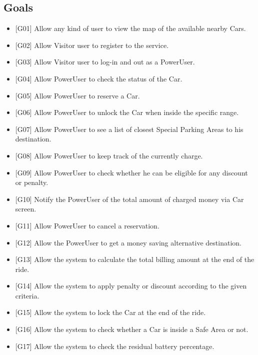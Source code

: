 \subsection{Goals}
\begin{itemize}
\item {[}G01{]} Allow any kind of user to view the map of the available nearby Cars.
\item {[}G02{]} Allow Visitor user to register to the service.
\item {[}G03{]} Allow Visitor user to log-in and out as a PowerUser.
\item {[}G04{]} Allow PowerUser to check the status of the Car.
\item {[}G05{]} Allow PowerUser to reserve a Car.
\item {[}G06{]} Allow PowerUser to unlock the Car when inside the specific range.
\item {[}G07{]} Allow PowerUser to see a list of closest Special Parking Areas to his destination.
\item {[}G08{]} Allow PowerUser to keep track of the currently charge. 
\item {[}G09{]} Allow PowerUser to check whether he can be eligible for any discount or penalty.
\item {[}G10{]} Notify the PowerUser of the total amount of charged money via Car screen.
\item {[}G11{]} Allow PowerUser to cancel a reservation.
\item {[}G12{]} Allow the PowerUser to get a money saving alternative destination.
\item {[}G13{]} Allow the system to calculate the total billing amount at the end of the ride.
\item {[}G14{]} Allow the system to apply penalty or discount according to the given criteria.
\item {[}G15{]} Allow the system to lock the Car at the end of the ride.
\item {[}G16{]} Allow the system to check whether a Car is inside a Safe Area or not.
\item {[}G17{]} Allow the system to check the residual battery percentage.
\end{itemize}